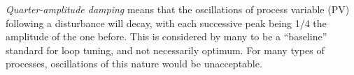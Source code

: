 {\it Quarter-amplitude damping} means that the oscillations of process variable (PV) following a disturbance will decay, with each successive peak being 1/4 the amplitude of the one before.  This is considered by many to be a ``baseline'' standard for loop tuning, and not necessarily optimum.  For many types of processes, oscillations of this nature would be unacceptable.











